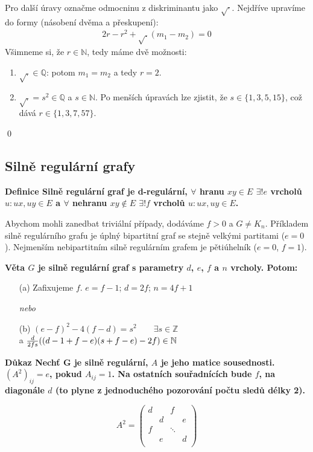 \documentclass[a4paper,12pt,titlepage]{article}
\newcommand{\dk}{\smallskip\noindent\bf Důkaz\rm{} }
\newcommand{\df}{\smallskip\noindent\bf Definice\rm{} }
\newcommand{\vt}{\smallskip\noindent\bf Věta\rm{} }
\newcommand{\Z}{\mathbb{Z}}
\newcommand{\Q}{\mathbb{Q}}
\newcommand{\N}{\mathbb{N}}
\begin{document}
Pro další úravy označme odmocninu z diskriminantu jako $\sqrt{\cdot}$. Nejdříve 
upravíme do formy (násobení dvěma a přeskupení):
\begin{align}
	2r - r^2 + \sqrt{.}(m_1 - m_2) = 0
\end{align}
Všimneme si, že $r\in\N$, tedy máme dvě možnosti:
\begin{enumerate}
	\item $\sqrt{.} \in \Q$: potom $m_1 = m_2$ a tedy $r = 2$.
	\item $\sqrt{.} = s^2 \in \Q$ a $s \in \N$. Po menších úpravách lze zjistit, 
	že $s\in \{1, 3, 5, 15\}$, což dává $r\in\{1, 3,7,57\}$.
\end{enumerate}
\qed

\subsection{Silně regulární grafy}

\df Silně regulární graf je d-regulární, $\forall$ hranu $xy\in E$ $\exists!e$
vrcholů $u: ux,uy\in E$ a $\forall$ nehranu $xy\not\in E$ $\exists!f$ vrcholů
$u: ux,uy\in E$.

Abychom mohli zanedbat triviální případy, dodáváme $f>0$ a $G\neq K_n$.
Příkladem silně regulárního grafu je úplný bipartitní graf se stejně velkými
partitami ($e=0$). Nejmenším nebipartitním silně regulárním grafem je
pětiúhelník ($e=0$, $f=1$).

\vt $G$ je silně regulární graf s parametry $d$, $e$, $f$ a $n$ vrcholy. Potom:
\begin{enumerate}
	\item[(a)] Zafixujeme $f$. $e = f-1$; $d = 2f$; $n = 4f+1$
	\item[] {\it nebo}
	\item[(b)] $(e-f)^2-4(f-d) = s^2 \qquad \exists s\in \Z$ \\
	a ${d\over 2fs}((d-1+f-e)(s+f-e)-2f) \in \N$
\end{enumerate}

\dk Nechť G je silně regulární, $A$ je jeho matice sousednosti. $(A^2)_{ij} =
e$, pokud $A_{ij} = 1$. Na ostatních souřadnících bude $f$, na diagonále $d$
(to plyne z jednoduchého pozorování počtu sledů délky 2).

$$
A^2 = \left(
	\begin{matrix}
		d & & f & \\
		& d & & e \\
		f & & \ddots & \\
		& e & & d\\
	\end{matrix}\right)
$$
\end{document}
